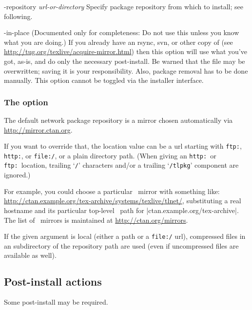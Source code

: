 \documentclass{article}
\begin{document}
\begin{ttdescription}
\item [-repository {\sl url-or-directory}] Specify package
  repository from which to install; see following.

\item[-in-place] (Documented only for completeness: Do not use this
  unless you know what you are doing.) If you already have an rsync, svn,
  or other copy of \TL{} (see
  \url{http://tug.org/texlive/acquire-mirror.html}) then this option
  will use what you've got, as-is, and do only the necessary
  post-install.  Be warned that the file 
  may be overwritten; saving it is your responsibility.  Also, package
  removal has to be done manually. This option cannot be toggled via the
  installer interface.
\end{ttdescription}


\subsubsection{The  option}
\label{sec:location}

The default network package repository is a \CTAN{} mirror chosen
automatically via \url{http://mirror.ctan.org}.

If you want to override that, the location value can be a url starting
with \texttt{ftp:}, \texttt{http:}, or \texttt{file:/}, or a plain
directory path.  (When giving an \texttt{http:}\ or \texttt{ftp:}\
location, trailing `\texttt{/}' characters and/or a trailing
`\texttt{/tlpkg}' component are ignored.)

For example, you could choose a particular \CTAN\ mirror with something
like: \url{http://ctan.example.org/tex-archive/systems/texlive/tlnet/},
substituting a real hostname and its particular top-level \CTAN\ path
for |ctan.example.org/tex-archive|.  The list of \CTAN\ mirrors is
maintained at \url{http://ctan.org/mirrors}.

If the given argument is local (either a path or a \texttt{file:/} url),
compressed files in an \dirname{archive} subdirectory of the repository
path are used (even if uncompressed files are available as well).


\subsection{Post-install actions}
\label{sec:postinstall}

Some post-install may be required.
\end{document}
